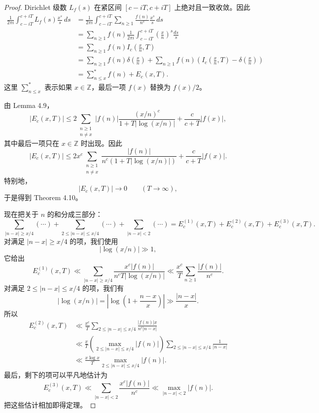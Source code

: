 \begin{proof}
	Dirichlet 级数 $L_f(s)$ 在紧区间 $[c-iT,c+iT]$ 上绝对且一致收敛。因此
	\[
	\begin{aligned}
		\frac1{2\pi i}\int_{c-iT}^{c+iT}
		L_f(s)\frac{x^s}{s}\,ds
		&=
		\frac1{2\pi i}\int_{c-iT}^{c+iT}
		\sum_{n\geq 1}\frac{f(n)}{n^s}\frac{x^s}{s}\,ds\\
		&=
		\sum_{n\geq 1}f(n)
		\frac1{2\pi i}\int_{c-iT}^{c+iT}
		\left(\frac{x}{n}\right)^s\frac{ds}{s}\\
		&=
		\sum_{n\geq 1}f(n)I_c\left(\frac{x}{n},T\right)\\
		&=
		\sum_{n\geq 1}f(n)\delta\left(\frac{x}{n}\right)
		+
		\sum_{n\geq 1}f(n)
		\left(I_c\left(\frac{x}{n},T\right)
		-
		\delta\left(\frac{x}{n}\right)\right)\\
		&=
		\sum_{n\leq x}^{*}f(n)+E_c(x,T).
	\end{aligned}
	\]
	这里 $\sum_{n\leq x}^{*}$ 表示如果 $x\in\mathbb Z$，最后一项 $f(x)$ 替换为 $f(x)/2$。

	由 Lemma 4.9，
	\[
		|E_c(x,T)|
		\leq
		2\sum_{\substack{n\geq 1\\ n\neq x}}
		|f(n)|\frac{(x/n)^c}{1+T|\log(x/n)|}
		+
		\frac{c}{c+T}|f(x)|,
	\]
	其中最后一项只在 $x\in\mathbb Z$ 时出现。因此
	\[
		|E_c(x,T)|
		\leq
		2x^c\sum_{\substack{n\geq 1\\ n\neq x}}
		\frac{|f(n)|}{n^c(1+T|\log(x/n)|)}
		+
		\frac{c}{c+T}|f(x)|.
	\]
	特别地，
	\[
		|E_c(x,T)|\to 0
		\qquad (T\to\infty),
	\]
	于是得到 Theorem 4.10。

	现在把关于 $n$ 的和分成三部分：
	\[
		\sum_{|n-x|\geq x/4}(\cdots)
		+
		\sum_{2\leq |n-x|\leq x/4}(\cdots)
		+
		\sum_{|n-x|<2}(\cdots)
		=
		E_c^{(1)}(x,T)+E_c^{(2)}(x,T)+E_c^{(3)}(x,T).
	\]
	对满足 $|n-x|\geq x/4$ 的项，我们使用
	\[
		|\log(x/n)|\gg 1,
	\]
	它给出
	\[
		E_c^{(1)}(x,T)
		\ll
		\sum_{|n-x|\geq x/4}
		\frac{x^c|f(n)|}{n^cT|\log(x/n)|}
		\ll
		\frac{x^c}{T}\sum_{n\geq 1}\frac{|f(n)|}{n^c}.
	\]
	对满足 $2\leq |n-x|\leq x/4$ 的项，我们有
	\[
		|\log(x/n)|
		=
		\left|\log\left(1+\frac{n-x}{x}\right)\right|
		\gg
		\frac{|n-x|}{x}.
	\]
	所以
	\[
	\begin{aligned}
		E_c^{(2)}(x,T)
		&\ll
		\frac{x^c}{T}
		\sum_{2\leq |n-x|\leq x/4}
		\frac{|f(n)|x}{n^c|n-x|}\\
		&\ll
		\frac{x}{T}
		\left(\max_{2\leq |n-x|\leq x/4}|f(n)|\right)
		\sum_{2\leq |n-x|\leq x/4}\frac1{|n-x|}\\
		&\ll
		\frac{x\log x}{T}
		\max_{2\leq |n-x|\leq x/4}|f(n)|.
	\end{aligned}
	\]
	最后，剩下的项可以平凡地估计为
	\[
		E_c^{(3)}(x,T)
		\ll
		\sum_{|n-x|<2}\frac{x^c|f(n)|}{n^c}
		\ll
		\max_{|n-x|<2}|f(n)|.
	\]
	把这些估计相加即得定理。
\end{proof}

